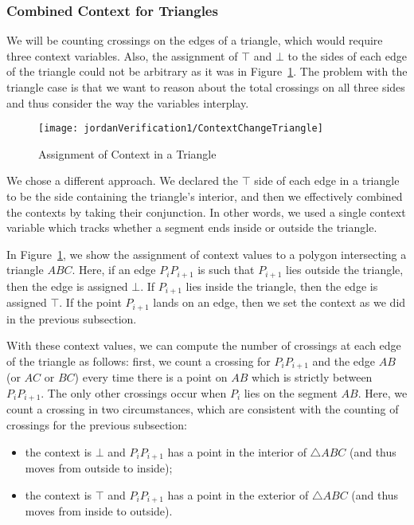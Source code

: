 \subsubsection{Combined Context for Triangles}
We will be counting crossings on the edges of a triangle, which would require three context variables. Also, the assignment of $\top$ and $\bot$ to the sides of each edge of the triangle could not be arbitrary as it was in Figure~\ref{fig:ContextChangesTriangle}. The problem with the triangle case is that we want to reason about the total crossings on all three sides and thus consider the way the variables interplay.

\begin{figure}
\centering\texttt{[image: jordanVerification1/ContextChangeTriangle]}
\caption{Assignment of Context in a Triangle}
\label{fig:ContextChangesTriangle}
\end{figure}

We chose a different approach. We declared the $\top$ side of each edge in a triangle to be the side containing the triangle's interior, and then we effectively combined the contexts by taking their conjunction. In other words, we used a single context variable which tracks whether a segment ends inside or outside the triangle. 

In Figure~\ref{fig:ContextChangesTriangle}, we show the assignment of context values to a polygon intersecting a triangle $ABC$. Here, if an edge $P_iP_{i+1}$ is such that $P_{i+1}$ lies outside the triangle, then the edge is assigned $\bot$. If $P_{i+1}$ lies inside the triangle, then the edge is assigned $\top$. If the point $P_{i+1}$ lands on an edge, then we set the context as we did in the previous subsection.

With these context values, we can compute the number of crossings at each edge of the triangle as follows: first, we count a crossing for $P_iP_{i+1}$ and the edge $AB$ (or $AC$ or $BC$) every time there is a point on $AB$ which is strictly between $P_iP_{i+1}$. The only other crossings occur when $P_i$ lies on the segment $AB$. Here, we count a crossing in two circumstances, which are consistent with the counting of crossings for the previous subsection:
\begin{itemize}
\item the context is $\bot$ and $P_iP_{i+1}$ has a point in the interior of $\triangle ABC$ (and thus moves from outside to inside);
\item the context is $\top$ and $P_iP_{i+1}$ has a point in the exterior of $\triangle ABC$ (and thus moves from inside to outside).
\end{itemize}

